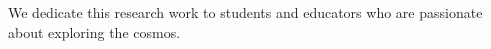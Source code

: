 \begin{dedication}

We dedicate this research work to students and educators who are passionate about exploring the cosmos.

\end{dedication}

